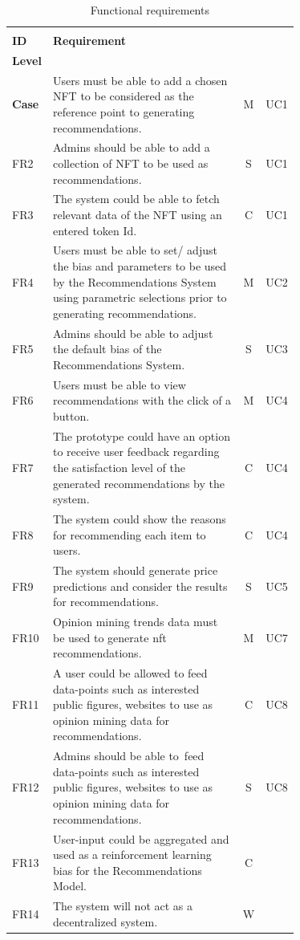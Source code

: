 \begin{longtable}{|l|p{0.71\linewidth}|c|l|}
\caption{Functional requirements}\\ 
\hline
\begin{tabular}[c]{@{}l@{}}\textbf{FR}\\\textbf{ID}\end{tabular}
& \textbf{Requirement} & \begin{tabular}[c]{@{}c@{}}\textbf{Priority}\\\textbf{Level}\end{tabular} & 
\begin{tabular}[c]{@{}c@{}}\textbf{Use}\\\textbf{Case}\end{tabular}
\endfirsthead 
\hline
FR1 & Users must be able to add a chosen NFT to be considered as the reference point to generating recommendations. & M & UC1 \\ 
\hline
FR2 & Admins should be able to add a collection of NFT to be used as recommendations. & S & UC1 \\ 
\hline
FR3 & The system could be able to fetch relevant data of the NFT using an entered token Id. & C & UC1 \\ 
\hline
FR4 & Users must be able to set/ adjust the bias and parameters to be used by the Recommendations System using parametric selections prior to generating recommendations. & M & UC2 \\ 
\hline
FR5 & Admins should be able to adjust the default bias of the Recommendations System. & S & UC3 \\ 
\hline
FR6 & Users must be able to view recommendations with the click of a button. & M & UC4 \\
\hline
FR7 & The prototype could have an option to receive user feedback regarding the satisfaction level of the generated recommendations by the system. & C & UC4 \\
\hline
FR8 & The system could show the reasons for recommending each item to users. & C & UC4 \\ \hline
FR9 & The system should generate price predictions and consider the results for recommendations. & S & UC5 \\ 
\hline
FR10 & Opinion mining trends data must be used to generate \gls{nft} recommendations. & M & UC7 \\
\hline
FR11 & A user could be allowed to feed data-points such as interested public figures, websites to use as opinion mining data for recommendations. & C & UC8 \\ 
\hline
FR12 & Admins should be able to~feed data-points such as interested public figures, websites to use as opinion mining data for recommendations. & S & UC8 \\
\hline
FR13 & User-input could be aggregated and used as a reinforcement learning bias for the Recommendations Model. & C &  \\
\hline
FR14 & The system will not act as a decentralized system. & W &  \\
\hline
\end{longtable}

